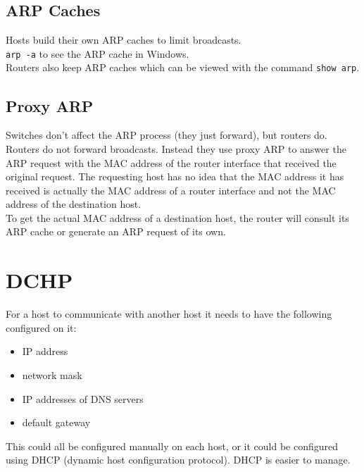 \documentclass{article}
\begin{document}
\subsection{ARP Caches}

Hosts build their own ARP caches to limit broadcasts.\\

\texttt{arp -a} to see the ARP cache in Windows.\\

Routers also keep ARP caches which can be viewed with the command
\texttt{show arp}.

\subsection{Proxy ARP}

Switches don't affect the ARP process (they just forward), but routers do.\\

Routers do not forward broadcasts. Instead they use proxy ARP to answer the
ARP request with the MAC address of the router interface that received the
original request. The requesting host has no idea that the MAC address it
has received is actually the MAC address of a router interface and not the
MAC address of the destination host.\\

To get the actual MAC address of a destination host, the router will consult
its ARP cache or generate an ARP request of its own.

\section{DCHP}

For a host to communicate with another host it needs to have the following
configured on it:\\

\begin{itemize}

\item IP address
\item network mask
\item IP addresses of DNS servers
\item default gateway

\end{itemize}

This could all be configured manually on each host, or it could be configured
using DHCP (dynamic host configuration protocol). DHCP is easier to manage.
\end{document}
